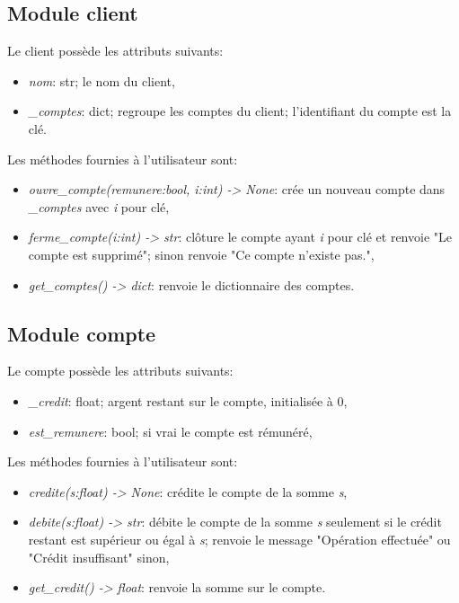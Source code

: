 \documentclass[a4paper,11pt]{article}
\begin{document}
\begin{Form}
\subsection{Module client}
Le client possède les attributs suivants:
\begin{itemize}
\item \emph{nom}: str; le nom du client,
\item \emph{\_comptes}: dict; regroupe les comptes du client; l'identifiant du compte est la clé.
\end{itemize}
Les méthodes fournies à l'utilisateur sont:
\begin{itemize}
\item \emph{ouvre\_compte(remunere:bool, i:int) -> None}: crée un nouveau compte dans \emph{\_comptes} avec \emph{i} pour clé,
\item \emph{ferme\_compte(i:int) -> str}: clôture le compte ayant \emph{i} pour clé et renvoie "Le compte est supprimé"; sinon renvoie "Ce compte n'existe pas.",
\item \emph{get\_comptes() -> dict}: renvoie le dictionnaire des comptes.
\end{itemize}
\subsection{Module compte}
Le compte possède les attributs suivants:
\begin{itemize}
\item \emph{\_credit}: float; argent restant sur le compte, initialisée à 0,
\item \emph{est\_remunere}: bool; si vrai le compte est rémunéré,
\end{itemize}
Les méthodes fournies à l'utilisateur sont:
\begin{itemize}
\item \emph{credite(s:float) -> None}: crédite le compte de la somme \emph{s},
\item \emph{debite(s:float) -> str}: débite le compte de la somme \emph{s} seulement si le crédit restant est supérieur ou égal à \emph{s}; renvoie le message "Opération effectuée" ou "Crédit insuffisant" sinon,
\item \emph{get\_credit() -> float}: renvoie la somme sur le compte.
\end{itemize}

\end{Form}
\end{document}
